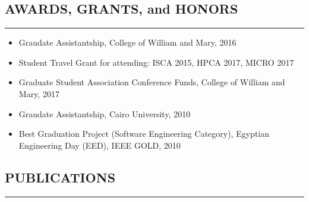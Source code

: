 \documentclass[10pt,a4]{article}
\begin{document}
\begin{itemize}


\end{itemize}

\subsection*{AWARDS, GRANTS, and HONORS}
\hrule
\vspace{0.2cm}
\begin{itemize}
\item Graudate Assistantship, College of William and Mary, 2016
\item Student Travel Grant for attending: ISCA 2015, HPCA 2017, MICRO 2017
\item Graduate Student Association Conference Funds, College of William and Mary, 2017
\item Graudate Assistantship, Cairo University, 2010
\item Best Graduation Project (Software Engineering Category), Egyptian Engineering Day (EED), IEEE GOLD, 2010
\end{itemize}

\subsection*{PUBLICATIONS}
\hrule
\vspace{0.2cm}
 
\end{document}
